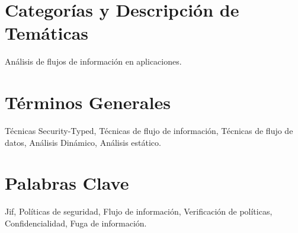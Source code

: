 \section*{Categorías y Descripción de Temáticas}
\label{sec:categorias}
Análisis de flujos de información en aplicaciones.


\section*{Términos Generales}
Técnicas Security-Typed,
Técnicas de flujo de información,
Técnicas de flujo de datos,
Análisis Dinámico,
Análisis estático.




\section*{Palabras Clave}
Jif, 
Políticas de seguridad,
Flujo de información,
Verificación de políticas,
Confidencialidad,
Fuga de información.

